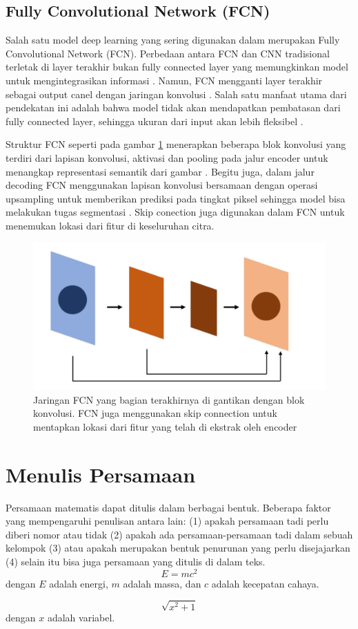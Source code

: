 \subsection{Fully Convolutional Network (FCN)}

Salah satu model deep learning yang sering digunakan dalam merupakan Fully Convolutional Network (FCN). Perbedaan antara FCN dan CNN tradisional terletak di layer terakhir bukan fully connected layer yang memungkinkan model untuk mengintegrasikan informasi . Namun, FCN mengganti layer terakhir sebagai output canel dengan jaringan konvolusi \cite{shlezinger_model-based_2023,huang_fully_2022}. Salah satu manfaat utama dari pendekatan ini adalah bahwa model tidak akan mendapatkan pembatasan dari fully connected layer, sehingga ukuran dari input akan lebih fleksibel \cite{iqbal_analyses_2023}.


Struktur FCN seperti pada gambar \ref{fig:fcn} menerapkan beberapa blok konvolusi yang terdiri dari lapisan konvolusi, aktivasi dan pooling pada jalur encoder untuk menangkap representasi semantik dari gambar \cite{azad_medical_2022}. Begitu juga, dalam jalur decoding FCN menggunakan lapisan konvolusi bersamaan dengan operasi upsampling untuk memberikan prediksi pada tingkat piksel sehingga model bisa melakukan tugas segmentasi \cite{deng_fcn_2023}. Skip conection juga digunakan dalam FCN untuk menemukan lokasi dari fitur di keseluruhan citra. 

\begin{figure}[H]
	\centering
	\includegraphics[scale=.2]{gambar/gambar-fcn.png}
	\caption{Jaringan FCN yang bagian terakhirnya di gantikan dengan blok konvolusi. FCN juga menggunakan skip connection untuk mentapkan lokasi dari fitur yang telah di ekstrak oleh encoder}
	\label{fig:fcn}
\end{figure}



\section{Menulis Persamaan}
\noindent Persamaan matematis dapat ditulis dalam berbagai bentuk. Beberapa faktor yang mempengaruhi penulisan antara lain: (1) apakah persamaan tadi perlu diberi nomor atau tidak (2) apakah ada persamaan-persamaan tadi dalam sebuah kelompok (3) atau apakah merupakan bentuk penurunan yang perlu disejajarkan (4) selain itu bisa juga persamaan yang ditulis di dalam teks.
\begin{equation}
E=mc^2
\end{equation}
    dengan $E$ adalah energi, $m$ adalah massa, dan $c$ adalah kecepatan cahaya.

\begin{equation}
\sqrt{x^2+1}
\end{equation}
    dengan $x$ adalah variabel.

